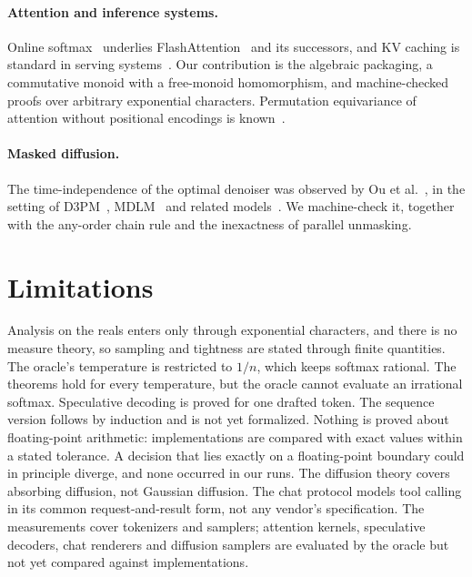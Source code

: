 \documentclass[10pt]{article}
\theoremstyle{qpt}
\begin{document}
\paragraph{Attention and inference systems.} Online softmax~\cite{milakov2018online}
underlies FlashAttention~\cite{dao2022flashattention} and its successors, and
KV caching is standard in serving systems~\cite{pope2023scaling,kwon2023vllm}. Our
contribution is the algebraic packaging, a commutative monoid with a free-monoid
homomorphism, and machine-checked proofs over arbitrary exponential characters.
Permutation equivariance of attention without positional encodings is
known~\cite{yun2020universal}.

\paragraph{Masked diffusion.} The time-independence of the optimal denoiser was
observed by Ou et al.~\cite{ou2025absorbing}, in the setting of
D3PM~\cite{austin2021d3pm}, MDLM~\cite{sahoo2024mdlm} and related
models~\cite{shi2024masked,nie2025llada}. We machine-check it, together with the
any-order chain rule and the inexactness of parallel unmasking.

\section{Limitations}

Analysis on the reals enters only through exponential characters, and there is no
measure theory, so sampling and tightness are stated through finite quantities. The
oracle's temperature is restricted to $1/n$, which keeps softmax rational. The
theorems hold for every temperature, but the oracle cannot evaluate an irrational
softmax. Speculative decoding is proved for one drafted token. The sequence version
follows by induction and is not yet formalized. Nothing is proved about
floating-point arithmetic: implementations are compared with exact values within a
stated tolerance. A decision that lies exactly on a floating-point boundary could in
principle diverge, and none occurred in our runs. The diffusion theory covers
absorbing diffusion, not Gaussian diffusion. The chat protocol models tool calling in
its common request-and-result form, not any vendor's specification. The measurements
cover tokenizers and samplers; attention kernels, speculative decoders, chat
renderers and diffusion samplers are evaluated by the oracle but not yet compared
against implementations.
\end{document}
